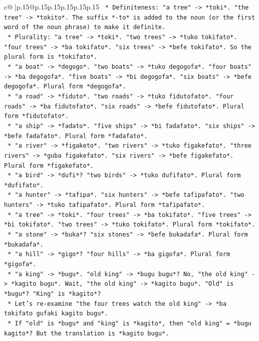 \documentclass{article}
\begin{document}
{\begin{supertabular}{c@{$\;$}|p{.15\linewidth}@{}p{.15\linewidth}p{.15\linewidth}p{.15\linewidth}p{.15\linewidth}p{.15\linewidth}}
{{{\texttt{        *   Definiteness: "a tree" {-}> *toki*. "the tree" {-}> *tokito*. The suffix *{-}to* is added to the noun (or the first word of the noun phrase) to make it definite.} \\
\texttt{        *   Plurality: "a tree" {-}> *toki*. "two trees" {-}> *tuko tokifato*. "four trees" {-}> *ba tokifato*. "six trees" {-}> *befe tokifato*. So the plural form is *tokifato*.} \\
\texttt{        *   "a boat" {-}> *degogo*. "two boats" {-}> *tuko degogofa*. "four boats" {-}> *ba degogofa*. "five boats" {-}> *bi degogofa*. "six boats" {-}> *befe degogofa*. Plural form *degogofa*.} \\
\texttt{        *   "a road" {-}> *fiduto*. "two roads" {-}> *tuko fidutofato*. "four roads" {-}> *ba fidutofato*. "six roads" {-}> *befe fidutofato*. Plural form *fidutofato*.} \\
\texttt{        *   "a ship" {-}> *fadato*. "five ships" {-}> *bi fadafato*. "six ships" {-}> *befe fadafato*. Plural form *fadafato*.} \\
\texttt{        *   "a river" {-}> *figaketo*. "two rivers" {-}> *tuko figakefato*. "three rivers" {-}> *guba figakefato*. "six rivers" {-}> *befe figakefato*. Plural form *figakefato*.} \\
\texttt{        *   "a bird" {-}> *dufi*? "two birds" {-}> *tuko dufifato*. Plural form *dufifato*.} \\
\texttt{        *   "a hunter" {-}> *tafipa*. "six hunters" {-}> *befe tafipafato*. "two hunters" {-}> *tuko tafipafato*. Plural form *tafipafato*.} \\
\texttt{        *   "a tree" {-}> *toki*. "four trees" {-}> *ba tokifato*. "five trees" {-}> *bi tokifato*. "two trees" {-}> *tuko tokifato*. Plural form *tokifato*.} \\
\texttt{        *   "a stone" {-}> *buka*? "six stones" {-}> *befe bukadafa*. Plural form *bukadafa*.} \\
\texttt{        *   "a hill" {-}> *gigo*? "four hills" {-}> *ba gigofa*. Plural form *gigofa*.} \\
\texttt{        *   "a king" {-}> *bugu*. "old king" {-}> *bugu bugu*? No, "the old king" {-}> *kagito bugu*. Wait, "the old king" {-}> *kagito bugu*. "Old" is *bugu*? "King" is *kagito*?} \\
\texttt{            *   Let's re{-}examine "the four trees watch the old king" {-}> *ba tokifato gufaki kagito bugu*.} \\
\texttt{            *   If "old" is *bugu* and "king" is *kagito*, then "old king" = *bugu kagito*? But the translation is *kagito bugu*.} \\
}}}
\end{supertabular}}
\end{document}
